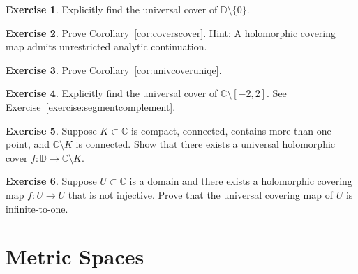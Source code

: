 \documentclass[12pt,openany]{book}
\newcommand{\C}{{\mathbb{C}}}
\newcommand{\D}{{\mathbb{D}}}
\theoremstyle{plain}
\theoremstyle{remark}
\theoremstyle{definition}
\newenvironment{exbox}{%
    \def\FrameCommand{\vrule width 1pt \relax\hspace{10pt}}%
    \MakeFramed{\advance\hsize-\width\FrameRestore}%
}{%
    \endMakeFramed
}
\theoremstyle{exercise}
\newtheorem{exercise}{Exercise}[section]
\theoremstyle{example}
\newcommand{\exerciseref}[1]{\hyperref[#1]{Exercise~\ref*{#1}}}
\newcommand{\corref}[1]{\hyperref[#1]{Corollary~\ref*{#1}}}
\begin{document}
\begin{exbox}
\begin{exercise}
Explicitly find the universal cover of $\D \setminus \{ 0 \}$.
\end{exercise}

\begin{exercise}
Prove \corref{cor:coverscover}.  Hint: A holomorphic covering map
admits unrestricted analytic continuation.
\end{exercise}

\begin{exercise}
Prove \corref{cor:univcoveruniqe}.
\end{exercise}

\begin{exercise}
Explicitly find the universal cover of $\C \setminus [-2,2]$.
See \exerciseref{exercise:segmentcomplement}.
\end{exercise}

\begin{exercise}
Suppose $K \subset \C$ is compact, connected, contains more than one
point, and $\C \setminus K$ is connected.  Show that there
exists a universal holomorphic cover $f \colon \D \to \C \setminus K$.
\end{exercise}

\begin{exercise}
Suppose $U \subset \C$ is a domain and there exists a
holomorphic covering map
$f \colon U \to U$ that is not injective.
Prove that the universal covering map of $U$ is infinite-to-one.
\end{exercise}
\end{exbox}


\appendix


\chapter{Metric Spaces} \label{ap:metric}
\end{document}
